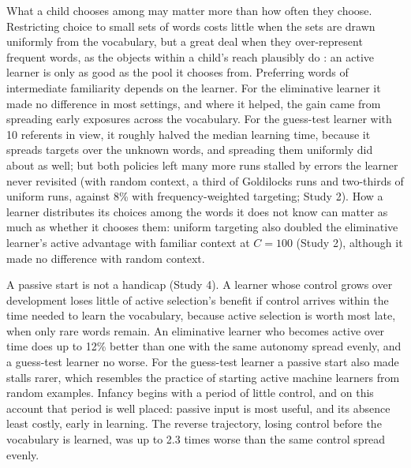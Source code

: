 \documentclass[a4paper,natbib,man]{apa6}
\begin{document}
What a child chooses among may matter more than how often they choose. Restricting choice to small sets of words costs little when the sets are drawn uniformly from the vocabulary, but a great deal when they over-represent frequent words, as the objects within a child's reach plausibly do \citep{Clerkin:2017}: an active learner is only as good as the pool it chooses from. Preferring words of intermediate familiarity \citep{Kidd:2012} depends on the learner. For the eliminative learner it made no difference in most settings, and where it helped, the gain came from spreading early exposures across the vocabulary. For the guess-test learner with 10 referents in view, it roughly halved the median learning time, because it spreads targets over the unknown words, and spreading them uniformly did about as well; but both policies left many more runs stalled by errors the learner never revisited (with random context, a third of Goldilocks runs and two-thirds of uniform runs, against 8\% with frequency-weighted targeting; Study 2). How a learner distributes its choices among the words it does not know can matter as much as whether it chooses them: uniform targeting also doubled the eliminative learner's active advantage with familiar context at $C=100$ (Study 2), although it made no difference with random context.

A passive start is not a handicap (Study 4). A learner whose control grows over development loses little of active selection's benefit if control arrives within the time needed to learn the vocabulary, because active selection is worth most late, when only rare words remain. An eliminative learner who becomes active over time does up to 12\% better than one with the same autonomy spread evenly, and a guess-test learner no worse. For the guess-test learner a passive start also made stalls rarer, which resembles the practice of starting active machine learners from random examples. Infancy begins with a period of little control, and on this account that period is well placed: passive input is most useful, and its absence least costly, early in learning. The reverse trajectory, losing control before the vocabulary is learned, was up to 2.3 times worse than the same control spread evenly.
\end{document}
